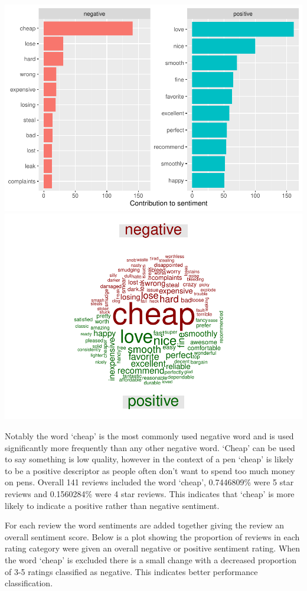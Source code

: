 \documentclass[
  11pt,
]{article}
\begin{document}
\includegraphics{Assignment-STAT702---final_files/figure-latex/3b word sentiment-1.pdf}
\includegraphics{Assignment-STAT702---final_files/figure-latex/3b word sentiment-2.pdf}

Notably the word `cheap' is the most commonly used negative word and is
used significantly more frequently than any other negative word. `Cheap'
can be used to say something is low quality, however in the context of a
pen `cheap' is likely to be a positive descriptor as people often don't
want to spend too much money on pens. Overall 141 reviews included the
word `cheap', 0.7446809\% were 5 star reviews and 0.1560284\% were 4
star reviews. This indicates that `cheap' is more likely to indicate a
positive rather than negative sentiment.

For each review the word sentiments are added together giving the review
an overall sentiment score. Below is a plot showing the proportion of
reviews in each rating category were given an overall negative or
positive sentiment rating. When the word `cheap' is excluded there is a
small change with a decreased proportion of 3-5 ratings classified as
negative. This indicates better performance classification.
\end{document}

